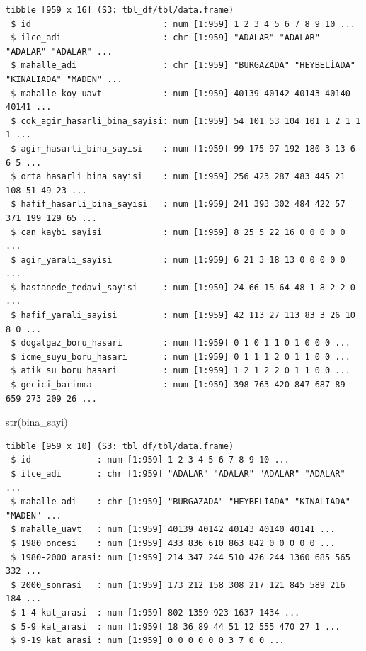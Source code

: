 \documentclass[
  11pt,
  a4paper,
  DIV=11,
  numbers=noendperiod]{scrartcl}
\newenvironment{Shaded}{\begin{snugshade}}{\end{snugshade}}
\newcommand{\FunctionTok}[1]{\textcolor[rgb]{0.28,0.35,0.67}{#1}}
\newcommand{\NormalTok}[1]{\textcolor[rgb]{0.00,0.23,0.31}{#1}}
\begin{document}
\begin{verbatim}
tibble [959 x 16] (S3: tbl_df/tbl/data.frame)
 $ id                          : num [1:959] 1 2 3 4 5 6 7 8 9 10 ...
 $ ilce_adi                    : chr [1:959] "ADALAR" "ADALAR" "ADALAR" "ADALAR" ...
 $ mahalle_adi                 : chr [1:959] "BURGAZADA" "HEYBELİADA" "KINALIADA" "MADEN" ...
 $ mahalle_koy_uavt            : num [1:959] 40139 40142 40143 40140 40141 ...
 $ cok_agir_hasarli_bina_sayisi: num [1:959] 54 101 53 104 101 1 2 1 1 1 ...
 $ agir_hasarli_bina_sayisi    : num [1:959] 99 175 97 192 180 3 13 6 6 5 ...
 $ orta_hasarli_bina_sayisi    : num [1:959] 256 423 287 483 445 21 108 51 49 23 ...
 $ hafif_hasarli_bina_sayisi   : num [1:959] 241 393 302 484 422 57 371 199 129 65 ...
 $ can_kaybi_sayisi            : num [1:959] 8 25 5 22 16 0 0 0 0 0 ...
 $ agir_yarali_sayisi          : num [1:959] 6 21 3 18 13 0 0 0 0 0 ...
 $ hastanede_tedavi_sayisi     : num [1:959] 24 66 15 64 48 1 8 2 2 0 ...
 $ hafif_yarali_sayisi         : num [1:959] 42 113 27 113 83 3 26 10 8 0 ...
 $ dogalgaz_boru_hasari        : num [1:959] 0 1 0 1 1 0 1 0 0 0 ...
 $ icme_suyu_boru_hasari       : num [1:959] 0 1 1 1 2 0 1 1 0 0 ...
 $ atik_su_boru_hasari         : num [1:959] 1 2 1 2 2 0 1 1 0 0 ...
 $ gecici_barinma              : num [1:959] 398 763 420 847 687 89 659 273 209 26 ...
\end{verbatim}

\begin{Shaded}
\begin{Highlighting}[]
\FunctionTok{str}\NormalTok{(bina\_sayi)}
\end{Highlighting}
\end{Shaded}

\begin{verbatim}
tibble [959 x 10] (S3: tbl_df/tbl/data.frame)
 $ id             : num [1:959] 1 2 3 4 5 6 7 8 9 10 ...
 $ ilce_adi       : chr [1:959] "ADALAR" "ADALAR" "ADALAR" "ADALAR" ...
 $ mahalle_adi    : chr [1:959] "BURGAZADA" "HEYBELİADA" "KINALIADA" "MADEN" ...
 $ mahalle_uavt   : num [1:959] 40139 40142 40143 40140 40141 ...
 $ 1980_oncesi    : num [1:959] 433 836 610 863 842 0 0 0 0 0 ...
 $ 1980-2000_arasi: num [1:959] 214 347 244 510 426 244 1360 685 565 332 ...
 $ 2000_sonrasi   : num [1:959] 173 212 158 308 217 121 845 589 216 184 ...
 $ 1-4 kat_arasi  : num [1:959] 802 1359 923 1637 1434 ...
 $ 5-9 kat_arasi  : num [1:959] 18 36 89 44 51 12 555 470 27 1 ...
 $ 9-19 kat_arasi : num [1:959] 0 0 0 0 0 0 3 7 0 0 ...
\end{verbatim}
\end{document}
